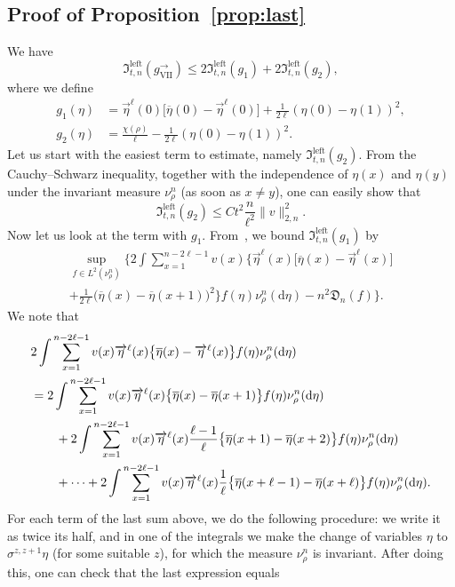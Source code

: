 \documentclass[10pt]{amsart}
\theoremstyle{definition}\newtheorem{defi}[theo]{Definition}\newtheorem{rema}[theo]{Remark}\newtheorem{exam}[theo]{Example}\newtheorem{exem}[theo]{Example}\newtheorem{nota}[theo]{Notation}
\newcommand*{\rmleft}{\mathrm{left}}
\newcommand*{\rmVII}{\mathrm{VII}}
\newcommand{\mf}[1]{{\mathfrak #1}}
\renewcommand\vec[1]{\overrightarrow{#1}}
\renewcommand{\bar}{\overline}
\renewcommand{\leq}{\leqslant}
\newcommand*{\dd}{\mathrm{d}}
\begin{document}
\subsection{Proof of Proposition~\ref{prop:last}} \label{ssec:separate}

We have
\[
\mf I_{t,n}^{\rmleft}(g_{\rmVII}^\rightarrow) \leq 2\mf I_{t,n}^{\rmleft}(g_1) + 2 \mf I_{t,n}^{\rmleft}(g_2),
\]
where we define
\begin{align*}
g_1(\eta)&=\vec\eta^\ell(0) \Big[\bar\eta(0)-\vec\eta^\ell(0)\Big] + \frac{1}{2\ell}(\eta(0)-\eta(1))^2,
\\ g_2(\eta) &= \frac{\chi(\rho)}{\ell}-\frac{1}{2\ell} (\eta(0)-\eta(1))^2.
\end{align*}
Let us start with the easiest term to estimate, namely $\mf I_{t,n}^{\rmleft}(g_2)$. From the Cauchy--Schwarz inequality, together with the independence of $\eta(x)$ and $\eta(y)$ under the invariant measure $\nu^n_\rho$ (as soon as $x\neq y$), one can easily show that
\[
\mf I_{t,n}^{\rmleft}(g_2) \leq Ct^2\frac{n}{\ell^2} \|v\|_{2,n}^2.
\]
Now let us look at the term with $g_1$. From~\cite[Lemma~2.4]{KLO}, we bound $\mf I_{t,n}^{\rmleft}(g_1)$ by
\begin{multline}\label{eq:multline}
\sup_{f\in L^2(\nu^n_\rho)} \bigg\{2\int \sum_{x=1}^{n-2\ell-1}v(x)\Big\{\vec{\eta}^{\ell}(x)\Big[\bar\eta(x)-\vec{\eta}^{\ell}(x)\Big]\\
+\frac{1}{2\ell}
\big(\bar{\eta}(x)-\bar{\eta}(x+1)\big)^2\Big\}f(\eta)\nu^n_\rho(\dd\eta) - n^2 \mathfrak D_n(f)\bigg\}.
\end{multline}
We note that
\begin{align}
&2\int \sum_{x=1}^{n-2\ell-1}v(x)\vec{\eta}^\ell(x)\big\{\bar{\eta}(x)-\vec{\eta}^\ell(x)\big\}f(\eta)\nu^n_\rho(\dd\eta)\label{eq:firstpart}
\\
& =2\int \sum_{x=1}^{n-2\ell-1}v(x)\vec{\eta}^\ell(x)\big\{\bar{\eta}(x)-\bar{\eta}(x+1)\big\}f(\eta)\nu^n_\rho(\dd\eta)\label{eq:ff}
\\
&\qquad +2\int \sum_{x=1}^{n-2\ell-1}v(x)\vec{\eta}^\ell(x)\frac{\ell-1}{\ell}\big\{\bar{\eta}(x+1)-\bar{\eta}(x+2)\big\}f(\eta)\nu^n_\rho(\dd\eta)\notag\\
&\qquad +\cdots+2 \int \sum_{x=1}^{n-2\ell-1}v(x)\vec{\eta}^\ell(x)\frac{1}{\ell}\big\{\bar{\eta}(x+\ell-1)-\bar{\eta}(x+\ell)\big\}f(\eta)\nu^n_\rho(\dd\eta).\notag
\end{align}
For each term of the last sum above, we do the following procedure: we write it as twice its half, and in one of the integrals we make the change of variables $\eta$ to $\sigma^{z,z+1}\eta$ (for some suitable $z$), for which the measure $\nu^n_\rho$ is invariant. After doing this, one can check that the last expression equals
\end{document}

